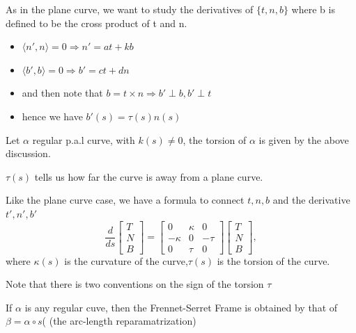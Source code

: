 \documentclass{article}
\begin{document}
As in the plane curve, we want to study the derivatives of $\{t,n,b\}$ where b is defined to be the cross product of t and n.
\begin{itemize}
    \item $\langle n',n\rangle=0 \Rightarrow n'=at+kb$
    \item $\langle b',b\rangle=0 \Rightarrow b'=ct+dn$
    \item and then note that $b=t \times n \Rightarrow b'\perp b, b'\perp t$
    \item hence we have $b'(s)=\tau(s)n(s)$
\end{itemize}
\begin{definition}[torsion]
    Let $\alpha$ regular p.a.l curve, with $k(s)\neq0$, the torsion of $\alpha $ is given by the above discussion.
\end{definition}
\begin{remark}
    $\tau(s)$ tells us how far the curve is away from a plane curve.
\end{remark}
\begin{proposition}
Like the plane curve case, we have a formula to connect $t,n,b$ and the derivative $t',n',b'$
\[
\frac{d}{ds}
\begin{bmatrix}
T \\[6pt]
N \\[6pt]
B
\end{bmatrix}
=
\begin{bmatrix}
0 & \kappa & 0 \\[6pt]
-\kappa & 0 & -\tau \\[6pt]
0 & \tau & 0
\end{bmatrix}
\begin{bmatrix}
T \\[6pt]
N \\[6pt]
B
\end{bmatrix},
\]
where $\kappa(s)$ is the curvature of the curve,$\tau(s)$ is the torsion of the curve.  
\end{proposition}
\begin{remark}
    Note that there is two conventions on the sign of the torsion $\tau$
\end{remark}
\begin{definition}
    If $\alpha$ is any regular cuve, then the Frennet-Serret Frame is obtained by that of $\beta=\alpha \circ s$( (the arc-length reparamatrization)
\end{definition}
\end{document}
